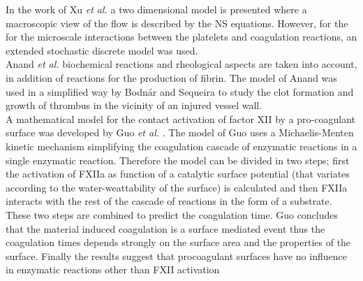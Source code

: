 \documentclass[%
 nofootinbib,
 amsmath,amssymb,
 aps,
 pra,
]{revtex4-1}
\begin{document}
In the work of Xu \textit{et al.} \cite{Xu:2008} a two dimensional model is presented where a macroscopic view of the flow is described by the NS equations. However, for the for the microscale interactions between the platelets and coagulation reactions, an extended stochastic discrete model was used.\\
Anand \textit{et al.} \citep{Anand:2003, Anand:2006, Anand:2008} biochemical reactions and rheological aspects are taken into account, in addition of reactions for the production of fibrin. The model of Anand \citep{Anand:2003} was used in a simplified way by Bodn\'{a}r and Sequeira \citep{Bodnar:2008} to study the clot formation and growth of thrombus in the vicinity of an injured vessel wall.\\
A mathematical model for the contact activation of factor XII by a pro-coagulant surface was developed by Guo \textit{et al.} \citep{Guo:2006}. The model of Guo uses a Michaelis-Menten kinetic mechanism simplifying the coagulation cascade of enzymatic reactions in a single enzymatic reaction. Therefore the model can be divided in two steps; first the activation of FXIIa as function of a catalytic surface potential (that variates according to the water-weattability of the surface) is calculated and then FXIIa interacts with the rest of the cascade of reactions in the form of a substrate. These two steps are combined to predict the coagulation time. Guo concludes that the material induced coagulation is a surface mediated event thus the coagulation times depends strongly on the surface area and the properties of the surface. Finally the results suggest that procoagulant surfaces have no influence in enzymatic reactions other than FXII activation
\end{document}
